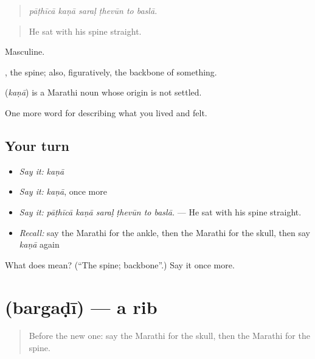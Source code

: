 \begin{quote}
\emph{pāṭhīcā kaṇā saraḷ ṭhevūn to baslā.}
\end{quote}

\begin{quote}
He sat with his spine straight.
\end{quote}

Masculine.

 , the spine; also, figuratively, the backbone of something.

\begin{cousinweb}
\textbf{} (\emph{kaṇā}) is a Marathi noun whose origin is not settled.
\end{cousinweb}

\begin{grammarlens}[title={What you've built}]
One more word for describing what you lived and felt.
\end{grammarlens}

\subsection*{Your turn}
\begin{itemize}
\raggedright
  \item \emph{Say it:} \emph{kaṇā}
  \item \emph{Say it:} \emph{kaṇā}, once more
  \item \emph{Say it:} \emph{pāṭhīcā kaṇā saraḷ ṭhevūn to baslā.} — He sat with his spine straight.
  \item \emph{Recall:} say the Marathi for the ankle, then the Marathi for the skull, then say \emph{kaṇā} again
\end{itemize}

\begin{tcolorbox}[breakable,colback=teal!4,colframe=teal!35!black,title={Before you move on}]
What does  mean? (\textquotedblleft{}The spine; backbone\textquotedblright{}.) Say it once more.
\end{tcolorbox}
\section[\texorpdfstring{\mr{बरगडी} (bargaḍī)}{बरगडी (bargaḍī)}]{ (bargaḍī) — a rib}

\label{lesson:MR-C478-bargadi}



\begin{quote}
Before the new one: say the Marathi for the skull, then the Marathi for the spine.
\end{quote}

